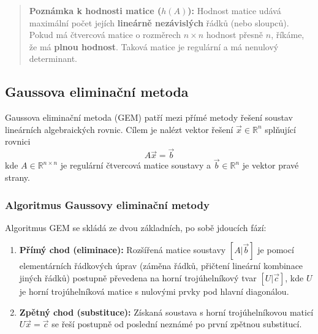 \begin{quote}
\textbf{Poznámka k hodnosti matice ($h(A)$):} 
Hodnost matice udává maximální počet jejích \textbf{lineárně nezávislých} řádků (nebo sloupců). 
Pokud má čtvercová matice o rozměrech $n \times n$ hodnost přesně $n$, říkáme, že má \textbf{plnou hodnost}. Taková matice je regulární a má nenulový determinant.
\end{quote}

\subsection{Gaussova eliminační metoda}

Gaussova eliminační metoda (GEM) patří mezi přímé metody řešení soustav lineárních algebraických rovnic. Cílem je nalézt vektor řešení $\vec{x} \in \mathbb{R}^n$ splňující rovnici
\[ A \vec{x} = \vec{b} \]
kde $A \in \mathbb{R}^{n \times n}$ je regulární čtvercová matice soustavy a $\vec{b} \in \mathbb{R}^n$ je vektor pravé strany.

\subsubsection{Algoritmus Gaussovy eliminační metody}
Algoritmus GEM se skládá ze dvou základních, po sobě jdoucích fází:
\begin{enumerate}
    \item \textbf{Přímý chod (eliminace):} Rozšířená matice soustavy $[A|\vec{b}]$ je pomocí elementárních řádkových úprav (záměna řádků, přičtení lineární kombinace jiných řádků) postupně převedena na horní trojúhelníkový tvar $[U|\vec{c}]$, kde $U$ je horní trojúhelníková matice s nulovými prvky pod hlavní diagonálou. 
    
    \item \textbf{Zpětný chod (substituce):} Získaná soustava s horní trojúhelníkovou maticí $U\vec{x} = \vec{c}$ se řeší postupně od poslední neznámé po první zpětnou substitucí.
\end{enumerate}

